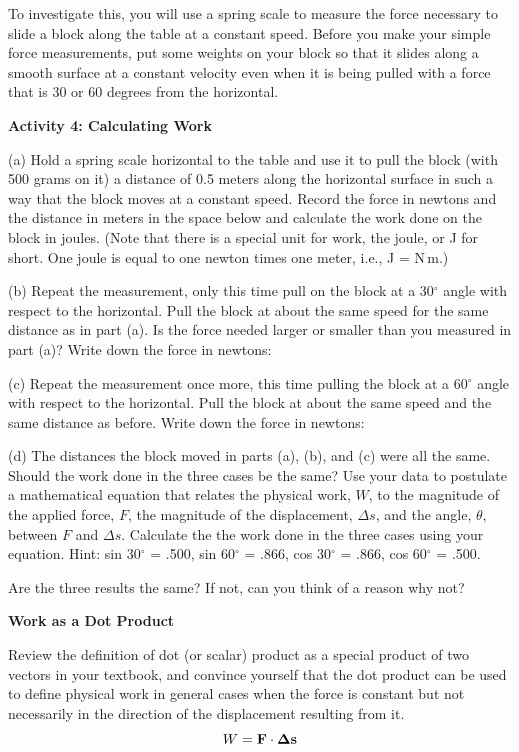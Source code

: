 To investigate this, you will use a spring scale to measure the force necessary
to slide a block along the table at a constant speed. Before you make your simple force measurements, put some weights on your block so that it slides along a smooth surface at a constant velocity even when it is being pulled with a force that is 30 or 60 degrees from the horizontal.

\pagebreak[2]

\textbf{Activity 4: Calculating Work} 

(a) Hold a spring scale horizontal to the table and use it to pull the block 
(with 500 grams on it)
a distance of 0.5 meters along the horizontal surface in such a way that the
block moves at a constant speed. Record the force in newtons and the distance
in meters in the space below and calculate the work done on the block in joules.
(Note that there is a special unit for work, the joule, or J for short. One 
joule is equal to one newton times one meter, i.e., J = N\,m.)
\answerspace{20mm}

(b) Repeat the measurement, only this time pull on the block at a 30\( ^{\circ } \) angle with respect to the horizontal. Pull the block at about the same speed for the same distance as in part (a). Is the force needed larger or smaller than you measured in part (a)? Write down the force in newtons:
\answerspace{10mm}

(c) Repeat the measurement once more, this time pulling the block at a 60\( ^{\circ } \) angle with respect to the horizontal.  Pull the block at about the same speed and the same distance as before. Write down the force in newtons:
\answerspace{10mm}

(d) The distances the block moved in parts (a), (b), and (c) were all the same.  Should the work done in the three cases be the same?  Use your data to postulate a mathematical equation
that relates the physical work, $W$, to the magnitude of the applied force, $F$,
the magnitude of the displacement, \( \Delta  s\), and the angle, \( \theta  \),
between $F$ and \( \Delta  s\).  Calculate the the work done in the three cases using your equation. 
 Hint: sin 30\( ^{\circ } \) = .500, sin 60\( ^{\circ } \) = .866, cos 30\( ^{\circ } \) = .866, cos 60\( ^{\circ } \)
= .500. 
\answerspace{35mm}

Are the three results the same?  If not, can you think of a reason why not?
\answerspace{25mm}

\textbf{Work as a Dot Product }

Review the definition of dot (or scalar) product as a special product of two
vectors in your textbook, and convince yourself that the dot product can be
used to define physical work in general cases when the force is constant but
not necessarily in the direction of the displacement resulting from it. 
\[W={\bf F}\cdot {\bf \Delta s}\]

